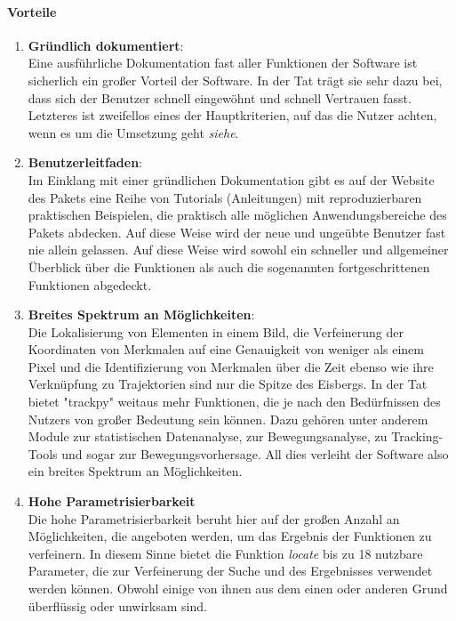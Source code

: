 	\paragraph{Vorteile}
		\begin{enumerate}
    			\item \textbf{Gründlich dokumentiert}:\label{kap1_trackpy_dokumentation}\\
    			Eine ausführliche Dokumentation fast aller Funktionen der Software ist sicherlich ein großer Vorteil der Software. In der Tat trägt sie sehr dazu bei, dass sich der Benutzer schnell eingewöhnt und schnell Vertrauen fasst. Letzteres ist zweifellos eines der Hauptkriterien, auf das die Nutzer achten, wenn es um die Umsetzung geht \textit{siehe}\cite{garousi2013evaluating}.
    			
    			\item \textbf{Benutzerleitfaden}: \label{kap1_trackpy_benutzerleitfaden}\\
				Im Einklang mit einer gründlichen Dokumentation gibt es auf der Website des Pakets eine Reihe von Tutorials (Anleitungen) mit reproduzierbaren praktischen Beispielen, die praktisch alle möglichen Anwendungsbereiche des Pakets abdecken. Auf diese Weise wird der neue und ungeübte Benutzer fast nie allein gelassen. Auf diese Weise wird sowohl ein schneller und allgemeiner Überblick über die Funktionen als auch die sogenannten fortgeschrittenen Funktionen abgedeckt.
				
    			\item \textbf{Breites Spektrum an Möglichkeiten}\label{kap1_trackpy_BSM}:\\
    			Die Lokalisierung von Elementen in einem Bild, die Verfeinerung der Koordinaten von Merkmalen auf eine Genauigkeit von weniger als einem Pixel und die Identifizierung von Merkmalen über die Zeit ebenso wie ihre Verknüpfung zu Trajektorien sind nur die Spitze des Eisbergs. In der Tat bietet "trackpy" weitaus mehr Funktionen, die je nach den Bedürfnissen des Nutzers von großer Bedeutung sein können. Dazu gehören unter anderem Module zur statistischen Datenanalyse, zur Bewegungsanalyse, zu Tracking-Tools und sogar zur Bewegungsvorhersage.
All dies verleiht der Software also ein breites Spektrum an Möglichkeiten.

    			\item \textbf{Hohe Parametrisierbarkeit}\label{kap1_trackpy_HP}\\
    			Die hohe Parametrisierbarkeit beruht hier auf der großen Anzahl an Möglichkeiten, die angeboten werden, um das Ergebnis der Funktionen zu verfeinern. In diesem Sinne bietet die Funktion \textit{locate}\citep{Tp} bis zu 18 nutzbare Parameter, die zur Verfeinerung der Suche und des Ergebnisses verwendet werden können. Obwohl einige von ihnen aus dem einen oder anderen Grund überflüssig oder unwirksam sind.
    			

\end{enumerate}
